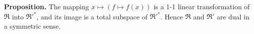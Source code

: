 \textbf{Proposition.} The mapping $x \mapsto (f \mapsto f(x))$ is a 1-1 linear transformation of $\mathfrak{R}$ into $\mathfrak{R}'^*$, and its image is a total subspace of $\mathfrak{R}'^*$. Hence $\mathfrak{R}$ and $\mathfrak{R}'$ are dual in a symmetric sense.

